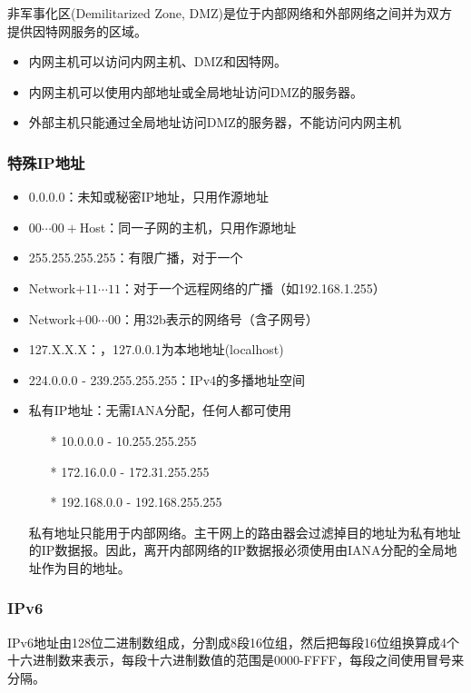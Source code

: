 \myhline
非军事化区(Demilitarized Zone, DMZ)是位于内部网络和外部网络之间并为双方提供因特网服务的区域。
\begin{itemize}
\item 内网主机可以访问内网主机、DMZ和因特网。
\item 内网主机可以使用内部地址或全局地址访问DMZ的服务器。
\item 外部主机只能通过全局地址访问DMZ的服务器，不能访问内网主机
\end{itemize}

\subsubsection{特殊IP地址}
\begin{itemize}
	\item 0.0.0.0：未知或秘密IP地址，只用作源地址
	\item $00\cdots00+$Host：同一子网的主机，只用作源地址
	\item 255.255.255.255：有限广播，对于一个
	\item Network$+11\cdots11$：对于一个远程网络的广播（如192.168.1.255）
	\item Network$+00\cdots00$：用32b表示的网络号（含子网号）
	\item 127.X.X.X：，127.0.0.1为本地地址(localhost)
	\item 224.0.0.0 - 239.255.255.255：IPv4的多播地址空间
	\item 私有IP地址：无需IANA分配，任何人都可使用
	\begin{itemize}
		\item[*] 10.0.0.0 - 10.255.255.255
		\item[*] 172.16.0.0 - 172.31.255.255
		\item[*] 192.168.0.0 - 192.168.255.255
	\end{itemize}
	私有地址只能用于内部网络。主干网上的路由器会过滤掉目的地址为私有地址的IP数据报。因此，离开内部网络的IP数据报必须使用由IANA分配的全局地址作为目的地址。
\end{itemize}

\subsubsection{IPv6}
IPv6地址由128位二进制数组成，分割成8段16位组，然后把每段16位组换算成4个十六进制数来表示，每段十六进制数值的范围是0000-FFFF，每段之间使用冒号来分隔。


